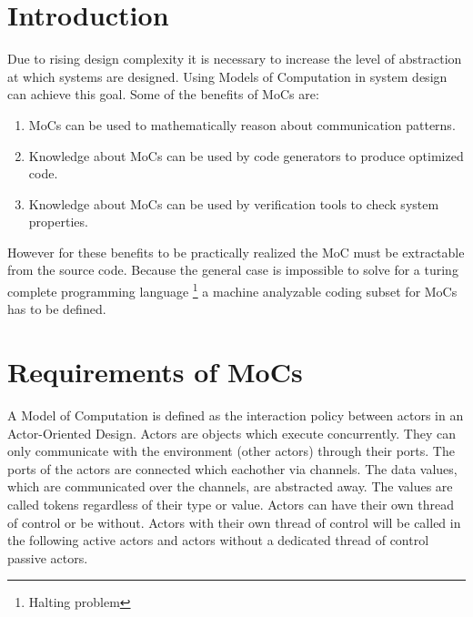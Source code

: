 \newcommand{\resdir}{../../../HscdTeXRes/}
\newcommand{\code}[1]{#1}



\usepackage{multirow}


\clearpage
\tableofcontents
\clearpage

\section{Introduction\label{intro}}
Due to rising design complexity it is necessary to increase
the level of abstraction at which systems are designed. Using
Models of Computation in system design can achieve this goal.
Some of the benefits of MoCs are:
\begin{enumerate}
\item MoCs can be used to mathematically reason about communication
patterns.

\item Knowledge about MoCs can be used by code generators to produce
optimized code.

\item Knowledge about MoCs can be used by verification tools to
check system properties.
\end{enumerate}
However for these benefits to be practically realized the
MoC must be extractable from the source code. Because the general case
is impossible to solve for a turing complete programming language
\footnote{Halting problem} a machine analyzable coding subset for
MoCs has to be defined.

\section{Requirements of MoCs}\label{Requirements of MoCs}

A Model of Computation is defined \cite{embsft:2002} as the 
interaction policy between actors in an Actor-Oriented Design.
Actors are objects which execute concurrently. They can only
communicate with the environment (other actors) through their ports.
The ports of the actors are connected which eachother via channels.
The data values, which are communicated over the channels,
are abstracted away. The values are called tokens regardless
of their type or value.
Actors can have their own thread of control or be without. Actors
with their own thread of control will be called in the following
active actors and actors without a dedicated thread of control
passive actors.

